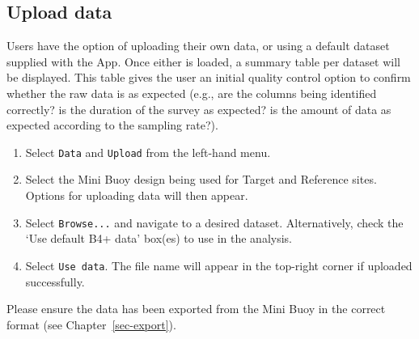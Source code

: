 \documentclass[
  letterpaper,
  DIV=11,
  numbers=noendperiod]{scrreprt}
\providecommand{\tightlist}{%
  \setlength{\itemsep}{0pt}\setlength{\parskip}{0pt}}\usepackage{longtable,booktabs,array}
\begin{document}
\hypertarget{sec-default}{%
\subsection{Upload data}\label{sec-default}}

Users have the option of uploading their own data, or using a default
dataset supplied with the App. Once either is loaded, a summary table
per dataset will be displayed. This table gives the user an initial
quality control option to confirm whether the raw data is as expected
(e.g., are the columns being identified correctly? is the duration of
the survey as expected? is the amount of data as expected according to
the sampling rate?).

\begin{enumerate}
\def\labelenumi{\arabic{enumi}.}
\tightlist
\item
  Select \texttt{Data} and \texttt{Upload} from the left-hand menu.
\item
  Select the Mini Buoy design being used for Target and Reference sites.
  Options for uploading data will then appear.
\item
  Select \texttt{Browse...} and navigate to a desired dataset.
  Alternatively, check the `Use default B4+ data' box(es) to use in the
  analysis.
\item
  Select \texttt{Use\ data}. The file name will appear in the top-right
  corner if uploaded successfully.
\end{enumerate}

\begin{tcolorbox}[enhanced jigsaw, bottomrule=.15mm, leftrule=.75mm, bottomtitle=1mm, breakable, opacityback=0, colback=white, left=2mm, toprule=.15mm, opacitybacktitle=0.6, arc=.35mm, colframe=quarto-callout-important-color-frame, toptitle=1mm, titlerule=0mm, colbacktitle=quarto-callout-important-color!10!white, coltitle=black, title=\textcolor{quarto-callout-important-color}{\faExclamation}\hspace{0.5em}{Important}, rightrule=.15mm]

Please ensure the data has been exported from the Mini Buoy in the
correct format (see Chapter~\ref{sec-export}).

\end{tcolorbox}
\end{document}
